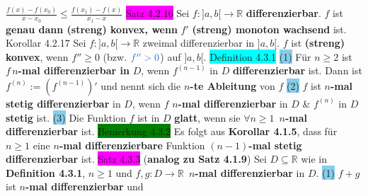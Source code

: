 \documentclass[landscape, 10pt]{article}
\newcommand{\R}{\mathbb{R}}
\begin{document}
\begin{multicols}{3}
{                $\frac{f(x)-f(x_0)}{x-x_0}\leqslant\frac{f(x_1)-f(x)}{x_1-x}$} 
\colorbox{magenta}{Satz 4.2.16} Sei \textcolor{NavyBlue}{$f:]a,b[\longrightarrow\R$}
                \textbf{differenzierbar}. 
                \textcolor{NavyBlue}{$f$} ist \textbf{genau dann (streng) konvex, wenn} 
                \textcolor{NavyBlue}{$f'$} \textbf{(streng) monoton
         wachsend} ist.
\colorbox{BurntOrange}{Korollar 4.2.17} Sei 
                \textcolor{NavyBlue}{$f:]a,b[\longrightarrow\R$}
                zweimal differenzierbar in \textcolor{NavyBlue}{$]a,b[$}. 
                \textcolor{NavyBlue}{$f$} ist \textbf{(streng) konvex}, 
                wenn \textcolor{NavyBlue}{$f''\geqslant0$} (bzw. 
         $\textcolor{NavyBlue}{f''>0}$) auf \textcolor{NavyBlue}{$]a,b[$}.
\colorbox{cyan}{Definition 4.3.1} \colorbox{SkyBlue}{(1)} Für $n\geqslant2$ ist 
                $f\,n$\textbf{-mal differenzierbar in} $D$, wenn 
                \textcolor{NavyBlue}{$f^{(n-1)}$} in \textcolor{NavyBlue}{$D$}
                \textbf{differenzierbar} ist. 
         Dann ist \textcolor{NavyBlue}{$f^{(n)}:=(f^{(n-1)})'$} und nennt 
                sich die $n$\textbf{-te Ableitung} von \textcolor{NavyBlue}{$f$}
         \colorbox{SkyBlue}{(2)} \textcolor{NavyBlue}{$f$} 
                ist $n$\textbf{-mal stetig differenzierbar} in \textcolor{NavyBlue}{$D$}, 
                wenn \textcolor{NavyBlue}{$f$} 
                \textbf{$n$-mal differenzierbar} in \textcolor{NavyBlue}{$D$}
                \& \textcolor{NavyBlue}{$f^{(n)}$} 
                in \textcolor{NavyBlue}{$D$} \textbf{stetig} ist.
         \colorbox{SkyBlue}{(3)} Die Funktion \textcolor{NavyBlue}{$f$} 
                ist in \textcolor{NavyBlue}{$D$} \textbf{glatt}, wenn sie 
                \textcolor{NavyBlue}{$\forall n\geqslant1$}\,
                \textbf{$n$-mal differenzierbar} ist.
\colorbox{green}{Bemerkung 4.3.2} Es folgt aus \textbf{Korollar 4.1.5}, dass für 
                \textcolor{NavyBlue}{$n\geqslant1$} eine \textbf{$n$-mal differenzierbare}
                Funktion \textbf{$(n-1)$-mal 
         stetig differenzierbar} ist.
\colorbox{magenta}{Satz 4.3.3} (\textbf{analog zu Satz 4.1.9}) Sei 
                \textcolor{NavyBlue}{$D\subseteq\R$} wie in 
                \textbf{Definition 4.3.1}, \textcolor{NavyBlue}{$n\geqslant1$} und 
                \textcolor{NavyBlue}{$f,g:D\longrightarrow\R$}\,
                \textbf{$n$-mal 
         differenzierbar} in \textcolor{NavyBlue}{$D$}. \quad
                \colorbox{SkyBlue}{(1)} \textcolor{NavyBlue}{$f+g$} 
                ist $n$\textbf{-mal differenzierbar} und 

\end{multicols}
\end{document}
